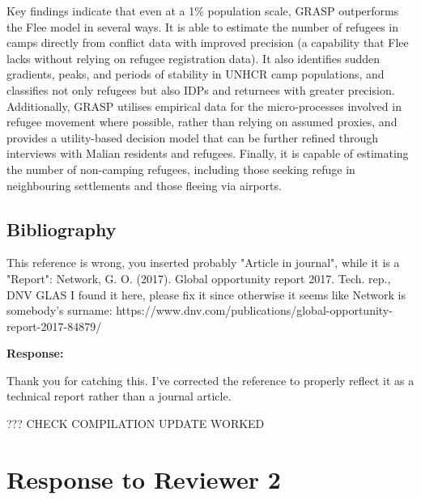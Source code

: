 \documentclass[11pt,a4paper]{article}
\begin{document}
\begin{updatebox}

Key findings indicate that even at a 1\% population scale, GRASP outperforms the Flee model in several ways. It is able to 
estimate the number of refugees in camps directly from conflict data with improved precision (a capability that Flee lacks 
without relying on refugee registration data). It also identifies sudden gradients, peaks, and periods of stability in UNHCR 
camp populations, and classifies not only refugees but also IDPs and returnees with greater precision. Additionally, GRASP 
utilises empirical data for the micro-processes involved in refugee movement where possible, rather than relying on assumed 
proxies, and provides a utility-based decision model that can be further refined through interviews with Malian residents and 
refugees. Finally, it is capable of estimating the number of non-camping refugees, including those seeking refuge in 
neighbouring settlements and those fleeing via airports.

\end{updatebox}

\vspace{0.5cm}

\subsection{Bibliography}

\begin{reviewbox}
This reference is wrong, you inserted probably "Article in journal", while it is a "Report": Network, G. O. (2017). Global opportunity report 2017. Tech. rep., DNV GLAS
I found it here, please fix it since otherwise it seems like Network is somebody's surname: https://www.dnv.com/publications/global-opportunity-report-2017-84879/
\end{reviewbox}

\textbf{Response:}

Thank you for catching this. I've corrected the reference to properly reflect it as a technical report rather than a journal article.

??? CHECK COMPILATION UPDATE WORKED

\vspace{0.5cm}

\section*{Response to Reviewer 2}
\end{document}
